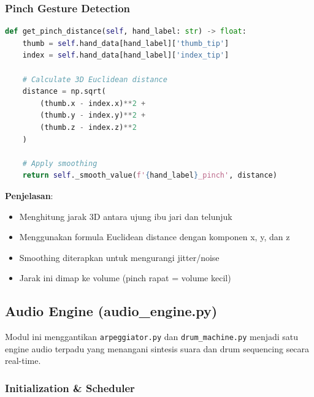 \subsubsection{Pinch Gesture Detection}

\begin{lstlisting}[language=Python, caption=Mendeteksi jarak pinch untuk volume control]
def get_pinch_distance(self, hand_label: str) -> float:
    thumb = self.hand_data[hand_label]['thumb_tip']
    index = self.hand_data[hand_label]['index_tip']
    
    # Calculate 3D Euclidean distance
    distance = np.sqrt(
        (thumb.x - index.x)**2 +
        (thumb.y - index.y)**2 +
        (thumb.z - index.z)**2
    )
    
    # Apply smoothing
    return self._smooth_value(f'{hand_label}_pinch', distance)
\end{lstlisting}

\textbf{Penjelasan}:
\begin{itemize}
    \item Menghitung jarak 3D antara ujung ibu jari dan telunjuk
    \item Menggunakan formula Euclidean distance dengan komponen x, y, dan z
    \item Smoothing diterapkan untuk mengurangi jitter/noise
    \item Jarak ini dimap ke volume (pinch rapat = volume kecil)
\end{itemize}



\subsection{Audio Engine (audio\_engine.py)}

Modul ini menggantikan \texttt{arpeggiator.py} dan \texttt{drum\_machine.py} menjadi satu engine audio terpadu yang menangani sintesis suara dan drum sequencing secara real-time.

\subsubsection{Initialization \& Scheduler}

